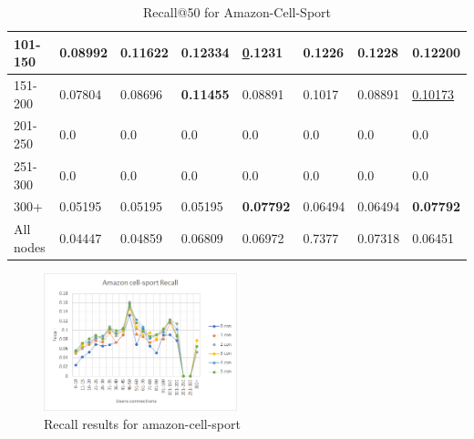 \begin{table}[h!]
\begin{tabular}{|l|l|l|l|l|l|l||l|}
        101-150     & 0.08992                        & 0.11622                        & \textbf{0.12334}               & {\ul 0.1231}                   & 0.1226                         & 0.1228                          & 0.12200                    \\ \hline
        151-200     & 0.07804                        & 0.08696                        & \textbf{0.11455}               & 0.08891                        & 0.1017                         & 0.08891                         & \underline{0.10173}        \\ \hline
        201-250     & 0.0                            & 0.0                            & 0.0                            & 0.0                            & 0.0                            & 0.0                             & 0.0                        \\ \hline
        251-300     & 0.0                            & 0.0                            & 0.0                            & 0.0                            & 0.0                            & 0.0                             & 0.0                        \\ \hline
        300+        & 0.05195                        & 0.05195                        & 0.05195                        & \textbf{0.07792}               & 0.06494                        & 0.06494                         & \textbf{0.07792}           \\ \hline
        All nodes   & 0.04447                        & 0.04859                        & 0.06809                        & 0.06972                        & 0.7377                         & 0.07318                         & 0.06451                    \\ \hline
    \end{tabular}
    \caption{Recall@50 for Amazon-Cell-Sport}
    \label{tab:Amazon-Cell-Sport-recall-evaluation}
\end{table}

\begin{figure}[h!]
    \includegraphics[width=0.5\textwidth]{figures/evaluation/amazon-cell-sport-recall.png}
    \centering
    \caption{Recall results for amazon-cell-sport}
    \label{fig:Amazon-Cell-Sport-recall-evaluation}
\end{figure}
\clearpage


